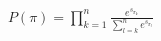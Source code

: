 \documentclass[preview]{standalone}
\begin{document}
\begin{align*}
P(\pi) = \prod_{k=1}^{n} \frac{e^{s_{\pi_k}}}{\sum_{l=k}^{n} e^{s_{\pi_l}}}
\end{align*}
\end{document}
